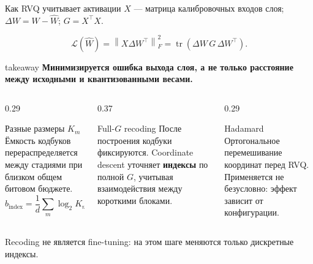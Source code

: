 \documentclass[aspectratio=169,10pt]{beamer}
\newcommand{\keypoint}[1]{%
  \begin{beamercolorbox}[
    sep=1.8mm,
    wd=\linewidth
  ]{takeaway}
    \small\bfseries #1
  \end{beamercolorbox}%
}
\begin{document}
\begin{frame}[t]{Как RVQ учитывает активации}
  $X$ --- матрица калибровочных входов слоя;
  $\Delta W=W-\widehat W$;
  $G=X^{\top}X$.

  \[
    \mathcal{L}(\widehat W)
    =
    \left\|X\Delta W^{\top}\right\|_F^2
    =
    \operatorname{tr}\!
    \left(
      \Delta W\,G\,\Delta W^{\top}
    \right).
  \]

  \keypoint{
    Минимизируется ошибка выхода слоя,
    а не только расстояние между исходными
    и квантизованными весами.
  }

  \vspace{1mm}

  \begin{columns}[T,onlytextwidth]

    \begin{column}{0.29\textwidth}
      \begin{block}{Разные размеры $K_m$}
        \small
        Ёмкость кодбуков
        перераспределяется между стадиями
        при близком общем битовом бюджете.
        \[
          b_{\mathrm{index}}
          =\frac{1}{d}\sum_m\log_2 K_m.
        \]
      \end{block}
    \end{column}

    \begin{column}{0.37\textwidth}
      \begin{block}{Full-$G$ recoding}
        \small
        После построения кодбуки фиксируются.
        Coordinate descent уточняет \textbf{индексы}
        по полной $G$, учитывая взаимодействия
        между короткими блоками.
      \end{block}
    \end{column}

    \begin{column}{0.29\textwidth}
      \begin{block}{Hadamard}
        \small
        Ортогональное перемешивание
        координат перед RVQ.
        Применяется не безусловно:
        эффект зависит от конфигурации.
      \end{block}
    \end{column}

  \end{columns}

  \vfill

  {\small\color{Muted}
    Recoding не является fine-tuning:
    на этом шаге меняются только дискретные индексы.
  }
\end{frame}
\end{document}
